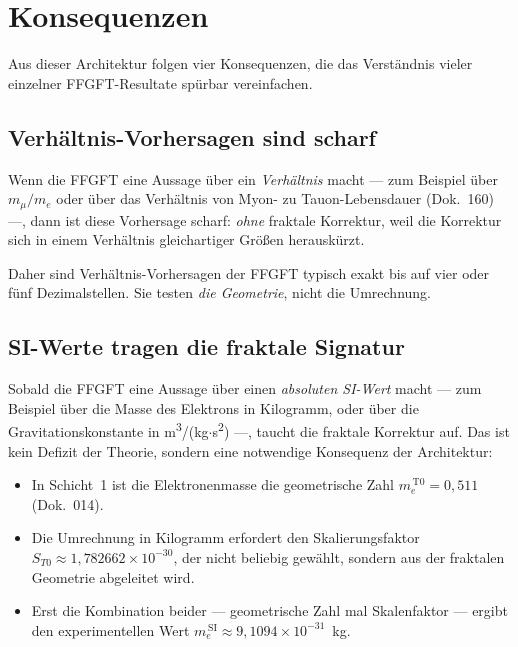 \section{Konsequenzen}

Aus dieser Architektur folgen vier Konsequenzen, die das Verständnis vieler
einzelner FFGFT-Resultate spürbar vereinfachen.

\subsection{Verhältnis-Vorhersagen sind scharf}

Wenn die FFGFT eine Aussage über ein \emph{Verhältnis} macht --- zum
Beispiel über $m_{\mu}/m_{e}$ oder über das Verhältnis von Myon- zu
Tauon-Lebensdauer (Dok.~160) ---, dann ist diese Vorhersage scharf:
\emph{ohne} fraktale Korrektur, weil die Korrektur sich in einem Verhältnis
gleichartiger Größen herauskürzt.

\begin{center}
\end{center}

Daher sind Verhältnis-Vorhersagen der FFGFT typisch exakt bis auf vier oder
fünf Dezimalstellen. Sie testen \emph{die Geometrie}, nicht die Umrechnung.

\subsection{SI-Werte tragen die fraktale Signatur}

Sobald die FFGFT eine Aussage über einen \emph{absoluten SI-Wert} macht ---
zum Beispiel über die Masse des Elektrons in Kilogramm, oder über die
Gravitationskonstante in m\textsuperscript{3}/(kg$\cdot$s\textsuperscript{2})
---, taucht die fraktale Korrektur auf. Das ist kein Defizit der Theorie,
sondern eine notwendige Konsequenz der Architektur:

\begin{itemize}\setlength\itemsep{0pt}
  \item In Schicht~1 ist die Elektronenmasse die geometrische Zahl
        $m_{e}^{\,\mathrm{T0}} = 0{,}511$ (Dok.~014).
  \item Die Umrechnung in Kilogramm erfordert den Skalierungsfaktor
        $S_{T0} \approx 1{,}782662\times 10^{-30}$, der nicht beliebig
        gewählt, sondern aus der fraktalen Geometrie abgeleitet wird.
  \item Erst die Kombination beider --- geometrische Zahl mal Skalenfaktor
        --- ergibt den experimentellen Wert
        $m_{e}^{\,\mathrm{SI}} \approx 9{,}1094 \times 10^{-31}$~kg.
\end{itemize}

